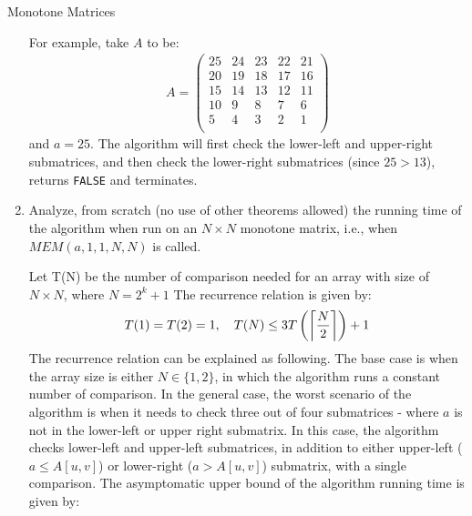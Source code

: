 \documentclass{article}
\begin{document}
\begin{section}{Monotone Matrices}
\begin{enumerate}
    For example, take $A$ to be:
    \begin{align*}
        A = \begin{pmatrix}
        25 & 24 & 23 & 22 & 21 \\
        20 & 19 & 18 & 17 & 16 \\
        15 & 14 & 13 & 12 & 11 \\
        10 & 9  & 8  & 7  & 6  \\
        5  & 4  & 3  & 2  & 1  \\
        \end{pmatrix}
    \end{align*}
    and $a = 25$. The algorithm will first check the lower-left and upper-right submatrices, and then check the lower-right submatrices (since $25 > 13$), returns {\tt FALSE} and terminates. 
    
    \item Analyze, from scratch (no use of other theorems allowed) the running time of the algorithm when run on an $N \times N$ monotone matrix, i.e., when $MEM(a, 1, 1, N, N)$ is called.
    
    Let T(N) be the number of comparison needed for an array with size of $N \times N$, where $N = 2^k + 1$ The recurrence relation is given by: 
    \begin{align*}
        T(1) = T(2) = 1, \quad T(N) \leq 3T\pbracket{\ceil*{\frac{N}{2}}} + 1
    \end{align*}
    The recurrence relation can be explained as following. The base case is when the array size is either $N \in \{1,2\}$, in which the algorithm runs a constant number of comparison. In the general case, the worst scenario of the algorithm is when it needs to check three out of four submatrices - where $a$ is not in the lower-left or upper right submatrix. In this case, the algorithm checks lower-left and upper-left submatrices, in addition to either upper-left ($a \leq A[u,v]$) or lower-right ($a > A[u,v]$) submatrix, with a single  comparison. The asymptomatic upper bound of the algorithm running time is given by:
    

\end{enumerate}
\end{section}
\end{document}
